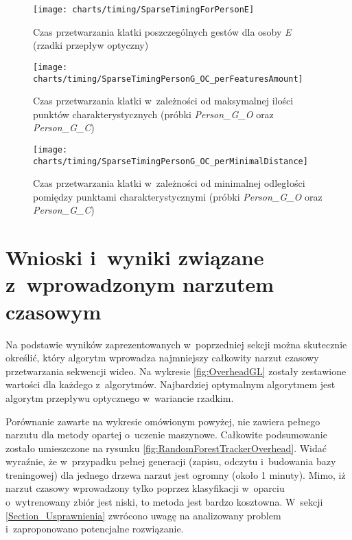     \begin{figure}[!ht]
      \centering
      \texttt{[image: charts/timing/SparseTimingForPersonE]}
      \caption[Czas przetwarzania klatki poszczególnych gestów dla osoby E]
              {Czas przetwarzania klatki poszczególnych gestów dla osoby \textit{E}\\(rzadki przepływ optyczny)}
      \label{fig:SparseTimingForPersonE}
    \end{figure}

    \newpage
    \begin{figure}[!ht]
      \centering
      \texttt{[image: charts/timing/SparseTimingPersonG\_OC\_perFeaturesAmount]}
      \caption[Czas przetwarzania klatki w~zależności od maksymalnej ilości punktów charakterystycznych]
              {Czas przetwarzania klatki w~zależności od maksymalnej ilości punktów charakterystycznych (próbki \textit{Person\_G\_O} oraz \textit{Person\_G\_C})}
      \label{fig:TimingPerFeaturesAmount}
    \end{figure}

    \begin{figure}[!ht]
      \centering
      \texttt{[image: charts/timing/SparseTimingPersonG\_OC\_perMinimalDistance]}
      \caption[Czas przetwarzania klatki w~zależności od minimalnej odległości pomiędzy punktami charakterystycznymi]
              {Czas przetwarzania klatki w~zależności od minimalnej odległości pomiędzy punktami charakterystycznymi (próbki \textit{Person\_G\_O} oraz \textit{Person\_G\_C})}
      \label{fig:TimingPerMinimalDistance}
    \end{figure}

  \section{Wnioski i~wyniki związane z~wprowadzonym narzutem czasowym}\label{Section_Overhead}
    Na podstawie wyników zaprezentowanych w~poprzedniej sekcji można skutecznie określić, który algorytm wprowadza najmniejszy całkowity narzut czasowy przetwarzania sekwencji wideo. Na wykresie \ref{fig:OverheadGL} zostały zestawione wartości dla każdego z~algorytmów. Najbardziej optymalnym algorytmem jest algorytm przepływu optycznego w~wariancie rzadkim.

    Porównanie zawarte na wykresie omówionym powyżej, nie zawiera pełnego narzutu dla metody opartej o~uczenie maszynowe. Całkowite podsumowanie zostało umieszczone na rysunku \ref{fig:RandomForestTrackerOverhead}. Widać wyraźnie, że w~przypadku pełnej generacji (zapisu, odczytu i~budowania bazy treningowej) dla jednego drzewa narzut jest ogromny (około 1 minuty). Mimo, iż narzut czasowy wprowadzony tylko poprzez klasyfikacji w~oparciu o~wytrenowany zbiór jest niski, to metoda jest bardzo kosztowna. W~sekcji \ref{Section_Usprawnienia} zwrócono uwagę na analizowany problem i~zaproponowano potencjalne rozwiązanie.

